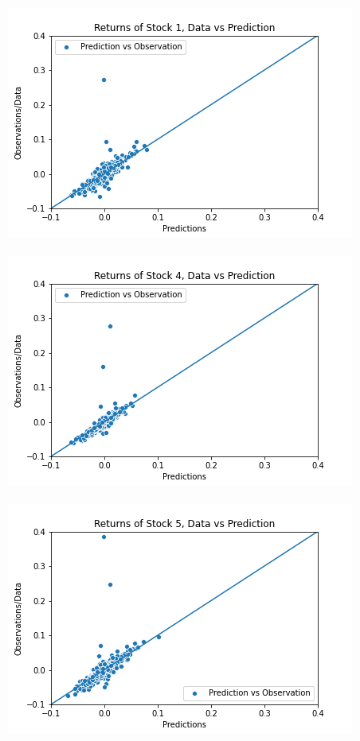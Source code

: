 \begin{figure}%
	\centering
	\begin{subfigure}[l]{0.3\textwidth}
		\includegraphics[width=\textwidth]{img/07_1/N120/Q1_kernel1_stock1_scatter.png}
	\end{subfigure}
	\begin{subfigure}[c]{0.3\textwidth}
		\includegraphics[width=\textwidth]{img/07_1/N120/Q1_kernel1_stock4_scatter.png}
	\end{subfigure}
	\begin{subfigure}[r]{0.3\textwidth}
		\includegraphics[width=\textwidth]{img/07_1/N120/Q1_kernel1_stock5_scatter.png}

\end{subfigure}
\end{figure}
